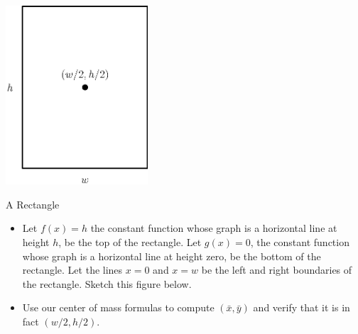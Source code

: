 	\begin{center}
		\includegraphics[width=150pt]{ChapterGeom/Figures/rectangle.eps}
	\end{center}
\begin{exercise}{A Rectangle \Coffeecup \Coffeecup}

\begin{itemize}

\item Let $f(x)=h$ the constant function whose graph is a horizontal line at height $h$, be the top of the rectangle.  Let $g(x)=0$, the constant function whose graph is a horizontal line at height zero, be the bottom of the rectangle.  Let the lines $x=0$ and $x=w$ be the left and right boundaries of the rectangle.  Sketch this figure below.


\item Use our center of mass formulas to compute $(\bar{x},\bar{y})$ and verify that it is in fact $(w/2,h/2)$.

\end{itemize}
\end{exercise}
